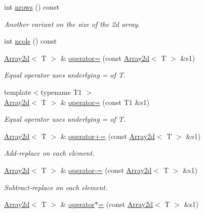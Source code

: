 \begin{DoxyCompactItemize}
int \mbox{\hyperlink{classXMLArray_1_1Array2d_a05ca0ef1e6fdbafb2c7cc575f9c3081c}{nrows}} () const
\begin{DoxyCompactList}\small\item\em Another variant on the size of the 2d array. \end{DoxyCompactList}\item 
int \mbox{\hyperlink{classXMLArray_1_1Array2d_a9eecadb91fe97638a8d7adce77b0a562}{ncols}} () const
\item 
\mbox{\hyperlink{classXMLArray_1_1Array2d}{Array2d}}$<$ T $>$ \& \mbox{\hyperlink{classXMLArray_1_1Array2d_a9fafd7ae228834d56b08fb5b1485eba4}{operator=}} (const \mbox{\hyperlink{classXMLArray_1_1Array2d}{Array2d}}$<$ T $>$ \&s1)
\begin{DoxyCompactList}\small\item\em Equal operator uses underlying = of T. \end{DoxyCompactList}\item 
{\footnotesize template$<$typename T1 $>$ }\\\mbox{\hyperlink{classXMLArray_1_1Array2d}{Array2d}}$<$ T $>$ \& \mbox{\hyperlink{classXMLArray_1_1Array2d_a2ac560b13ec78975a0cab0b2dcbfe72f}{operator=}} (const T1 \&s1)
\begin{DoxyCompactList}\small\item\em Equal operator uses underlying = of T. \end{DoxyCompactList}\item 
\mbox{\hyperlink{classXMLArray_1_1Array2d}{Array2d}}$<$ T $>$ \& \mbox{\hyperlink{classXMLArray_1_1Array2d_a1e4469713c271b4d9c02ac881cdf00dd}{operator+=}} (const \mbox{\hyperlink{classXMLArray_1_1Array2d}{Array2d}}$<$ T $>$ \&s1)
\begin{DoxyCompactList}\small\item\em Add-\/replace on each element. \end{DoxyCompactList}\item 
\mbox{\hyperlink{classXMLArray_1_1Array2d}{Array2d}}$<$ T $>$ \& \mbox{\hyperlink{classXMLArray_1_1Array2d_aaeb259530dba3f189e129c935391d92a}{operator-\/=}} (const \mbox{\hyperlink{classXMLArray_1_1Array2d}{Array2d}}$<$ T $>$ \&s1)
\begin{DoxyCompactList}\small\item\em Subtract-\/replace on each element. \end{DoxyCompactList}\item 
\mbox{\hyperlink{classXMLArray_1_1Array2d}{Array2d}}$<$ T $>$ \& \mbox{\hyperlink{classXMLArray_1_1Array2d_a591d1e6e7de9fd024657bb6e9264a89b}{operator$\ast$=}} (const \mbox{\hyperlink{classXMLArray_1_1Array2d}{Array2d}}$<$ T $>$ \&s1)

\end{DoxyCompactItemize}
